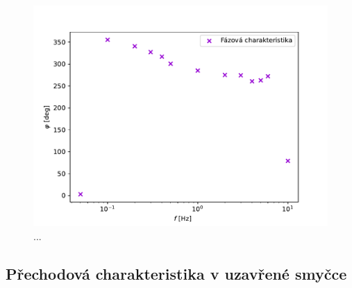 		\begin{figure}[!hbt] %
			\centering
			\includegraphics[]{img/graf_fazova_otevrena.pdf} %
			\caption{...} %
			\label{fig:fazova} %
		\end{figure}

	\subsection{Přechodová charakteristika v uzavřené smyčce}

